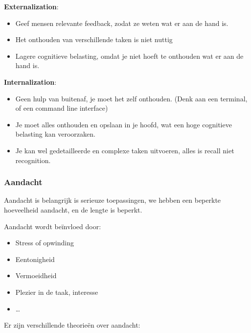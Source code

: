\documentclass[nonacm, sigconf, balance=true]{acmart}
\begin{document}
    \textbf{Externalization}:
    \begin{itemize}
        \item Geef mensen relevante feedback, zodat ze weten wat er aan de hand is.
        \item Het onthouden van verschillende taken is niet nuttig
        \item Lagere cognitieve belasting, omdat je niet hoeft te onthouden wat er aan de hand is.
    \end{itemize}

    \textbf{Internalization}:
    \begin{itemize}
        \item Geen hulp van buitenaf, je moet het zelf onthouden.
        (Denk aan een terminal, of een command line interface)
        \item Je moet alles onthouden en opslaan in je hoofd, wat een hoge cognitieve belasting kan veroorzaken.
        \item Je kan wel gedetailleerde en complexe taken uitvoeren, alles is recall niet recognition.
    \end{itemize}

    \subsubsection{Aandacht}
    Aandacht is belangrijk is serieuze toepassingen, we hebben een beperkte hoeveelheid aandacht, en de lengte is beperkt.

    Aandacht wordt beïnvloed door:
    \begin{itemize}
        \item Stress of opwinding
        \item Eentonigheid
        \item Vermoeidheid
        \item Plezier in de taak, interesse
        \item \ldots
    \end{itemize}

    Er zijn verschillende theorieën over aandacht:
\end{document}

